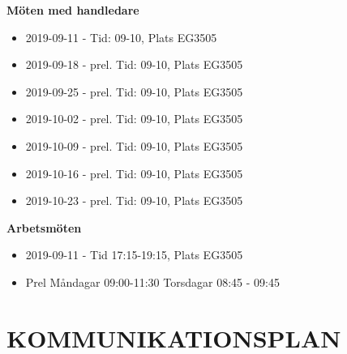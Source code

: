 \documentclass[a4paper]{article}
\begin{document}
\textbf{Möten med handledare}
\begin{itemize}
	\item 2019-09-11 - Tid: 09-10, Plats EG3505
	\item 2019-09-18 - prel. Tid: 09-10, Plats EG3505
	\item 2019-09-25 - prel. Tid: 09-10, Plats EG3505
	\item 2019-10-02 - prel. Tid: 09-10, Plats EG3505
	\item 2019-10-09 - prel. Tid: 09-10, Plats EG3505
	\item 2019-10-16 - prel. Tid: 09-10, Plats EG3505
	\item 2019-10-23 - prel. Tid: 09-10, Plats EG3505

\end{itemize}
\noindent
\textbf{Arbetsmöten}
\begin{itemize}
	\item 2019-09-11 - Tid 17:15-19:15, Plats EG3505
	\item Prel Måndagar 09:00-11:30 Torsdagar 08:45 - 09:45

\end{itemize}

\section{KOMMUNIKATIONSPLAN}
\label{sec:komm}
\end{document}
